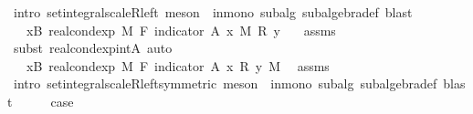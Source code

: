 \begin{isabellebody}
\ {\isacharparenleft}{\kern0pt}intro\ set{\isacharunderscore}{\kern0pt}integral{\isacharunderscore}{\kern0pt}scaleR{\isacharunderscore}{\kern0pt}left{\isacharcomma}{\kern0pt}\ meson\ {}\ in{\isacharunderscore}{\kern0pt}mono\ subalg\ subalgebra{\isacharunderscore}{\kern0pt}def{\isacharcomma}{\kern0pt}\ blast{\isacharparenright}{\kern0pt}\isanewline
\ \ \isamarkupfalse%
\ \isamarkupfalse%
\ {\isachardoublequoteopen}{\isachardot}{\kern0pt}{\isachardot}{\kern0pt}{\isachardot}{\kern0pt}\ {\isacharequal}{\kern0pt}\ {\isacharparenleft}{\kern0pt}{\isasymintegral}x{\isasymin}B{\isachardot}{\kern0pt}\ real{\isacharunderscore}{\kern0pt}cond{\isacharunderscore}{\kern0pt}exp\ M\ F\ {\isacharparenleft}{\kern0pt}indicator\ A{\isacharparenright}{\kern0pt}\ x\ {\isasympartial}M{\isacharparenright}{\kern0pt}\ {\isacharasterisk}{\kern0pt}\isactrlsub R\ y{\isachardoublequoteclose}\ \isamarkupfalse%
\ {}\ assms\ \isamarkupfalse%
\ {\isacharparenleft}{\kern0pt}subst\ real{\isacharunderscore}{\kern0pt}cond{\isacharunderscore}{\kern0pt}exp{\isacharunderscore}{\kern0pt}intA{\isacharcomma}{\kern0pt}\ auto{\isacharparenright}{\kern0pt}\isanewline
\ \ \isamarkupfalse%
\ \isamarkupfalse%
\ {\isachardoublequoteopen}{\isachardot}{\kern0pt}{\isachardot}{\kern0pt}{\isachardot}{\kern0pt}\ {\isacharequal}{\kern0pt}\ {\isasymintegral}x{\isasymin}B{\isachardot}{\kern0pt}\ {\isacharparenleft}{\kern0pt}real{\isacharunderscore}{\kern0pt}cond{\isacharunderscore}{\kern0pt}exp\ M\ F\ {\isacharparenleft}{\kern0pt}indicator\ A{\isacharparenright}{\kern0pt}\ x\ {\isacharasterisk}{\kern0pt}\isactrlsub R\ y{\isacharparenright}{\kern0pt}\ {\isasympartial}M{\isachardoublequoteclose}\ \isamarkupfalse%
\ assms\ \isamarkupfalse%
\ {\isacharparenleft}{\kern0pt}intro\ set{\isacharunderscore}{\kern0pt}integral{\isacharunderscore}{\kern0pt}scaleR{\isacharunderscore}{\kern0pt}left{\isacharbrackleft}{\kern0pt}symmetric{\isacharbrackright}{\kern0pt}{\isacharcomma}{\kern0pt}\ meson\ {}\ in{\isacharunderscore}{\kern0pt}mono\ subalg\ subalgebra{\isacharunderscore}{\kern0pt}def{\isacharcomma}{\kern0pt}\ blast{\isacharparenright}{\kern0pt}\isanewline
\ \ \isamarkupfalse%
\ \isamarkupfalse%
\ {\isacharquery}{\kern0pt}case\ \isacommand{{\isachardot}{\kern0pt}}\isamarkupfalse%
\isanewline
{}\isamarkupfalse%
\isanewline
\ \ \isamarkupfalse%
\ {}\isanewline
\ \ \isamarkupfalse%

\end{isabellebody}
